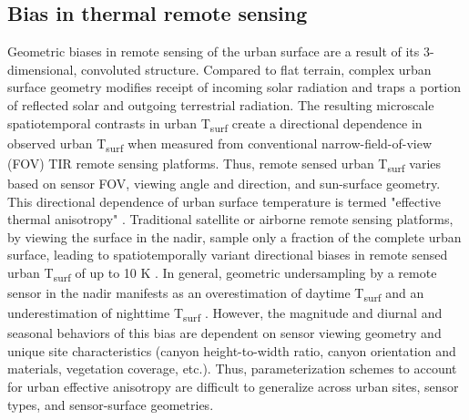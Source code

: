 \begin{bibunit}
\subsection{Bias in thermal remote sensing}
Geometric biases in remote sensing of the urban surface are a result of its 3-dimensional, convoluted structure. Compared to flat terrain, complex urban surface geometry modifies receipt of incoming solar radiation and traps a portion of reflected solar and outgoing terrestrial radiation. The resulting microscale spatiotemporal contrasts in urban T\textsubscript{surf} create a directional dependence in observed urban T\textsubscript{surf} when measured from conventional narrow-field-of-view (FOV) TIR remote sensing platforms. Thus, remote sensed urban T\textsubscript{surf} varies based on sensor FOV, viewing angle and direction, and sun-surface geometry. This directional dependence of urban surface temperature is termed "effective thermal anisotropy" \citep{Voogt1998a}. Traditional satellite or airborne remote sensing platforms, by viewing the surface in the nadir, sample only a fraction of the complete urban surface, leading to spatiotemporally variant directional biases in remote sensed urban T\textsubscript{surf} of up to 10 \si{\kelvin} \citep{Voogt1995}. In general, geometric undersampling by a remote sensor in the nadir manifests as an overestimation of daytime T\textsubscript{surf} and an underestimation of nighttime T\textsubscript{surf} \citep{Adderley2015}. However, the magnitude and diurnal and seasonal behaviors of this bias are dependent on sensor viewing geometry and unique site characteristics (canyon height-to-width ratio, canyon orientation and materials, vegetation coverage, etc.). Thus, parameterization schemes to account for urban effective anisotropy are difficult to generalize across urban sites, sensor types, and sensor-surface geometries.


\end{bibunit}
